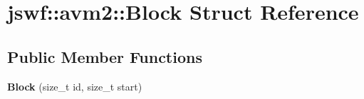 \hypertarget{structjswf_1_1avm2_1_1_block}{\section{jswf\+:\+:avm2\+:\+:Block Struct Reference}
\label{structjswf_1_1avm2_1_1_block}
}
\subsection*{Public Member Functions}
\begin{DoxyCompactItemize}
\item 
\hypertarget{structjswf_1_1avm2_1_1_block_a936e55b309066dbec37d0cd7be0ad4e4}{{\bfseries Block} (size\+\_\+t id, size\+\_\+t start)}\label{structjswf_1_1avm2_1_1_block_a936e55b309066dbec37d0cd7be0ad4e4}

\end{DoxyCompactItemize}
